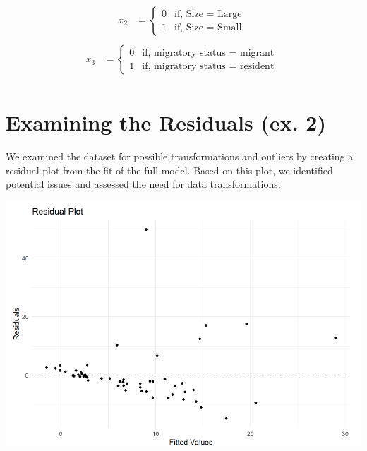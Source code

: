 \documentclass{article}
\begin{document}
\[\begin{aligned} 
        x_2 & = 
         \begin{cases}
             0 &  \text{if, Size  = Large }\\
             1 &  \text{if, Size = Small }   
         \end{cases}\\[3pt]
          \label{equ:yannibel}
       \end{aligned} 
       \]
\[\begin{aligned} 
        x_3 & = 
         \begin{cases}
             0 &  \text{if, migratory status  = migrant }\\
             1 &  \text{if, migratory status  = resident }   
         \end{cases}\\[3pt]
          \label{equ:yannibel}
       \end{aligned} 
       \]



\section{Examining the Residuals (ex. 2)}

We examined the dataset for possible transformations and outliers by creating a residual plot from the fit of the full model. Based on this plot, we identified potential issues and assessed the need for data transformations.

\begin{center}
\includegraphics[scale=0.5]{graphs/residual.png}
\end{center}
\end{document}
